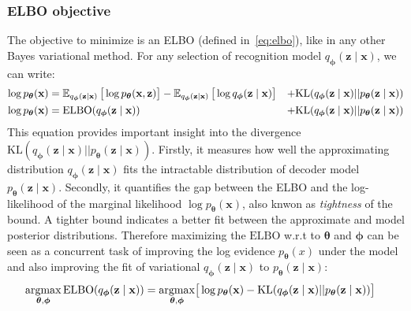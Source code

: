 \subsubsection{ELBO objective}
The objective to minimize is an ELBO (defined in~\ref{eq:elbo}), like in any other Bayes variational method. For any selection of recognition model $q_{\boldsymbol{\phi}}(\mathbf{z}\mid \mathbf{x})$,
we can write:
\begin{align}
    \label{eq:vae}
    \log p_{\boldsymbol{\theta}}(\mathbf{x})  &= \operatorname{\mathbb{E}}_{q_{\boldsymbol{\phi}}(\mathbf{z}\mid \mathbf{x})} \big[\log p_{\boldsymbol{\theta}}(\mathbf{x},\mathbf{z})\big] - \operatorname{\mathbb{E}}_{q_{\boldsymbol{\phi}}(\mathbf{z}\mid \mathbf{x})} \big[\log q_{\boldsymbol{\phi}}(\mathbf{z}\mid \mathbf{x})\big] &+ \mathrm{KL}(q_{\boldsymbol{\phi}}(\mathbf{z}\mid \mathbf{x}) || p_{\boldsymbol{\theta}}(\mathbf{z} \mid  \mathbf{x})) \\
    \log p_{\boldsymbol{\theta}}(\mathbf{x})  &= \mathrm{ELBO}(q_{\boldsymbol{\phi}}(\mathbf{z}\mid \mathbf{x})) &+ \mathrm{KL}(q_{\boldsymbol{\phi}}(\mathbf{z}\mid \mathbf{x}) || p_{\boldsymbol{\theta}}(\mathbf{z} \mid  \mathbf{x}))
\end{align}
This equation provides important insight into the divergence $\mathrm{KL}(q_{\boldsymbol{\phi}}(\mathbf{z}\mid \mathbf{x}) || p_{\boldsymbol{\theta}}(\mathbf{z} \mid  \mathbf{x}))$. 
Firstly, it measures how well the approximating distribution $q_{\boldsymbol{\phi}}(\mathbf{z}\mid \mathbf{x})$ fits the intractable distribution of decoder 
model $p_{\boldsymbol{\theta}}(\mathbf{z} \mid  \mathbf{x})$. Secondly, it quantifies the gap between the ELBO and the log-likelihood of the marginal likelihood 
$\log p_{\boldsymbol{\theta}}(\mathbf{x})$, also knwon as \textit{tightness} of the bound. A tighter bound indicates a better fit between the approximate 
and model posterior distributions. Therefore maximizing the $\mathrm{ELBO}$ w.r.t to ${\boldsymbol{\theta}}$ and ${\boldsymbol{\phi}}$ can be seen as a concurrent task of 
improving the log evidence $p_{\boldsymbol{\theta}}(x)$ under the model and also improving the fit of variational $q_{\boldsymbol{\phi}}(\mathbf{z}\mid \mathbf{x})$ to 
$p_{\boldsymbol{\theta}}(\mathbf{z} \mid  \mathbf{x})$:
\begin{align}
    \label{eq:opt_vae}
    \mathop{\rm argmax}_{{\boldsymbol{\theta}},{\boldsymbol{\phi}}} \mathrm{ELBO}(q_{\boldsymbol{\phi}}(\mathbf{z}\mid \mathbf{x})) &= \mathop{\rm argmax}_{{\boldsymbol{\theta}},{\boldsymbol{\phi}}} \bigr[ \log p_{\boldsymbol{\theta}}(\mathbf{x}) - \mathrm{KL}(q_{\boldsymbol{\phi}}(\mathbf{z}\mid \mathbf{x}) || p_{\boldsymbol{\theta}}(\mathbf{z} \mid  \mathbf{x})) \bigl] 
\end{align}
